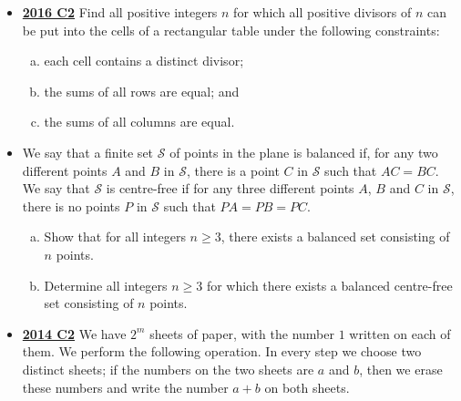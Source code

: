 \documentclass[11pt]{scrartcl}
\begin{document}
\begin{itemize}[leftmargin=*]
    Prove that for any chameleon $X$ , there exists a chameleon $Y$ such that $X$ cannot be changed to $Y$ using fewer than $\dfrac{3n^2}{2}$ swaps.
    \item \href{https://artofproblemsolving.com/community/c6h1480692p8639256}{\textbf{2016 C2}} Find all positive integers $n$ for which all positive divisors of $n$ can be put into the cells of a rectangular table under the following constraints:
    \begin{enumerate}[(a)]
        \item each cell contains a distinct divisor;
        \item the sums of all rows are equal; and
        \item the sums of all columns are equal.
    \end{enumerate}
    \item {} We say that a finite set $\mathcal{S}$ of points in the plane is balanced if, for any two different points $A$ and $B$ in $\mathcal{S}$, there is a point $C$ in $\mathcal{S}$ such that $AC=BC$. We say that $\mathcal{S}$ is centre-free if for any three different points $A$, $B$ and $C$ in $\mathcal{S}$, there is no points $P$ in $\mathcal{S}$ such that $PA=PB=PC$. 
    \begin{enumerate}[(a)]
        \item Show that for all integers $n\geqslant 3$, there exists a balanced set consisting of $n$ points.
        \item Determine all integers $n\geqslant 3$ for which there exists a balanced centre-free set consisting of $n$ points.
    \end{enumerate}
    \item \href{https://artofproblemsolving.com/community/c6h1113184p5083546}{\textbf{2014 C2}} We have $2^m$ sheets of paper, with the number $1$ written on each of them. We perform the following operation. In every step we choose two distinct sheets; if the numbers on the two sheets are $a$ and $b$, then we erase these numbers and write the number $a + b$ on both sheets. 
    

\end{itemize}
\end{document}

